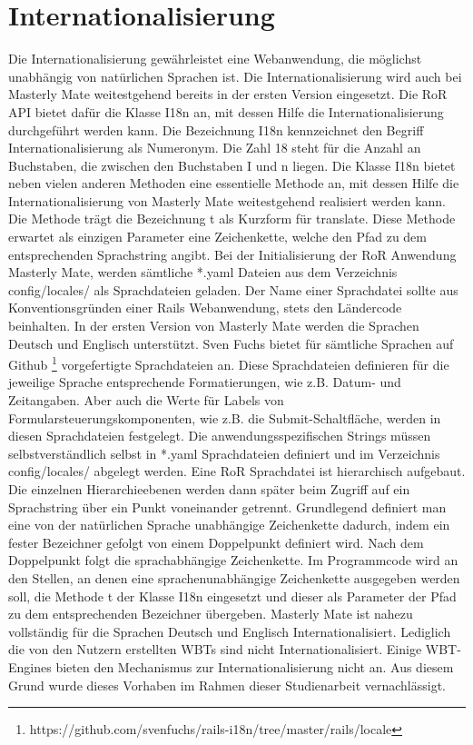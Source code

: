 \section{Internationalisierung}\label{ref:internationalisierung}
\begin{k}
Die Internationalisierung gewährleistet eine Webanwendung, die möglichst
unabhängig von natürlichen Sprachen ist. Die Internationalisierung wird
auch bei Masterly Mate weitestgehend bereits in der ersten Version eingesetzt.
Die RoR API bietet dafür die Klasse I18n an, mit dessen Hilfe die
Internationalisierung durchgeführt werden kann. Die Bezeichnung I18n
kennzeichnet den Begriff Internationalisierung als Numeronym. Die Zahl 18 steht
für die Anzahl an Buchstaben, die zwischen den Buchstaben I und n liegen.
Die Klasse I18n bietet neben vielen anderen Methoden eine essentielle Methode
an, mit dessen Hilfe die Internationalisierung von Masterly Mate weitestgehend
realisiert werden kann. Die Methode trägt die Bezeichnung t als Kurzform für
translate. Diese Methode erwartet als einzigen Parameter eine Zeichenkette,
welche den Pfad zu dem entsprechenden Sprachstring angibt. Bei der
Initialisierung der RoR Anwendung Masterly Mate, werden sämtliche *.yaml Dateien
aus dem Verzeichnis config/locales/ als Sprachdateien geladen. Der Name einer
Sprachdatei sollte aus Konventionsgründen einer Rails Webanwendung, stets den
Ländercode beinhalten. In der ersten Version von Masterly Mate werden die
Sprachen Deutsch und Englisch unterstützt. Sven Fuchs bietet für sämtliche
Sprachen auf Github
\footnote{https://github.com/svenfuchs/rails-i18n/tree/master/rails/locale} vorgefertigte Sprachdateien an. Diese Sprachdateien definieren für die jeweilige Sprache entsprechende Formatierungen, wie z.B.
Datum- und Zeitangaben. Aber auch die Werte für Labels von
Formularsteuerungskomponenten, wie z.B. die Submit-Schaltfläche, werden in
diesen Sprachdateien festgelegt. Die anwendungsspezifischen Strings müssen
selbstverständlich selbst in *.yaml Sprachdateien definiert und im Verzeichnis
config/locales/ abgelegt werden. Eine RoR Sprachdatei ist hierarchisch
aufgebaut. Die einzelnen Hierarchieebenen werden dann später beim Zugriff auf
ein Sprachstring über ein Punkt voneinander getrennt. Grundlegend definiert man
eine von der natürlichen Sprache unabhängige Zeichenkette dadurch, indem ein
fester Bezeichner gefolgt von einem Doppelpunkt definiert wird. Nach dem
Doppelpunkt folgt die sprachabhängige Zeichenkette. Im Programmcode wird an den
Stellen, an denen eine sprachenunabhängige Zeichenkette ausgegeben werden soll,
die Methode t der Klasse I18n eingesetzt und dieser als Parameter der Pfad zu
dem entsprechenden Bezeichner übergeben.
Masterly Mate ist nahezu vollständig für die Sprachen Deutsch und
Englisch Internationalisiert. Lediglich die von den Nutzern erstellten WBTs sind
nicht Internationalisiert. Einige WBT-Engines bieten den Mechanismus zur
Internationalisierung nicht an. Aus diesem Grund wurde dieses Vorhaben im Rahmen
dieser Studienarbeit vernachlässigt.
\end{k}

